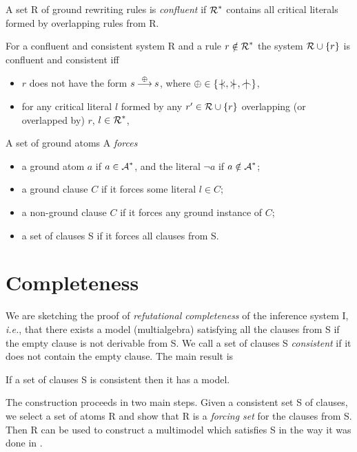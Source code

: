 \begin{definition} \label{def:confluent-system}
A set \C R of ground rewriting rules is {\em confluent} if \(\mbox {$\cal R$}^\ast\)
contains all critical literals formed by overlapping rules from \C R.
\end{definition}

\begin{lemma} \label{le:preserve-confluency}
For a confluent and consistent system \C R and a rule \(r\notin\mbox {$\cal R$}^\ast\)
the system \(\mbox {$\cal R$}\cup \{r\}\) is confluent and consistent iff
\begin{itemize}\smallerspaces
\item $r$ does not have the form  \(s\mathbin {\stackrel {\oplus}{\longrightarrow}} s\), where
 \(\oplus\in\{\notIncl,\notCont,\notInt\}\),
\item for any critical literal $l$ formed by any \(r'\in \mbox {$\cal R$}
\cup\{r\}\) overlapping (or overlapped by) $r$, $l\in \mbox {$\cal R$}^\ast$,
\end{itemize}
\end{lemma}

\begin{definition} \label{def:forcing}
A set of ground atoms \C A {\em forces}
\begin{itemize}\smallerspaces
\item a ground atom  $a$ if \(a\in\mbox {$\cal A$}^\ast\), and the literal \(\neg a\) if 
\(a\notin \mbox {$\cal A$}^\ast\);
\item a ground clause $C$ if it forces some literal \(l\in C\);
\item a non-ground clause $C$ if it forces any ground instance of $C$;
\item a set of clauses \C S if it forces all clauses from \C S.
\end{itemize}
\end{definition}

\section{Completeness} \label{se:completeness}

We are sketching the proof of {\em refutational completeness} of the inference system
\C I, {\em i.e.}, that there exists a model (multialgebra) satisfying all the
clauses from \C S if the empty clause is not derivable from \C S.  We call a
set of clauses \C S {\em consistent} if it does not contain the empty clause.
The main result is

\begin{theorem}[Completeness] \label{completeness}
If a set of clauses \C S is consistent then it has a model.
\end{theorem}
\noindent
The construction proceeds in two main steps. Given a consistent set \C S
of clauses, we select a set of atoms \C R %
and show that \C R is a {\em forcing set}\/ for  the clauses from \C S.
Then %
\C R can be used to construct a multimodel which satisfies \C S in the
way it was done in \cite{KW}. 

